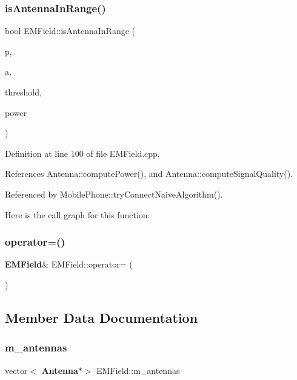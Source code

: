 \subsubsection{is\+Antenna\+In\+Range()}
{\footnotesize\ttfamily bool E\+M\+Field\+::is\+Antenna\+In\+Range (\begin{DoxyParamCaption}\item[{Point $\ast$}]{p,  }\item[{\textbf{ Antenna} $\ast$}]{a,  }\item[{double}]{threshold,  }\item[{bool}]{power }\end{DoxyParamCaption})}



Definition at line 100 of file E\+M\+Field.\+cpp.



References Antenna\+::compute\+Power(), and Antenna\+::compute\+Signal\+Quality().



Referenced by Mobile\+Phone\+::try\+Connect\+Naive\+Algorithm().

Here is the call graph for this function\+:
\mbox{\label{class_e_m_field_ad35e4754cad2016d7df1b8ac45540b35}} 
\subsubsection{operator=()}
{\footnotesize\ttfamily \textbf{ E\+M\+Field}\& E\+M\+Field\+::operator= (\begin{DoxyParamCaption}\item[{const \textbf{ E\+M\+Field} \&}]{ }\end{DoxyParamCaption})\hspace{0.3cm}{\ttfamily [private]}}



\subsection{Member Data Documentation}
\mbox{\label{class_e_m_field_ab74a3bde70b66fd033bde6c25345a755}} 
\subsubsection{m\+\_\+antennas}
{\footnotesize\ttfamily vector$<$\textbf{ Antenna}$\ast$$>$ E\+M\+Field\+::m\+\_\+antennas\hspace{0.3cm}{\ttfamily [private]}}



